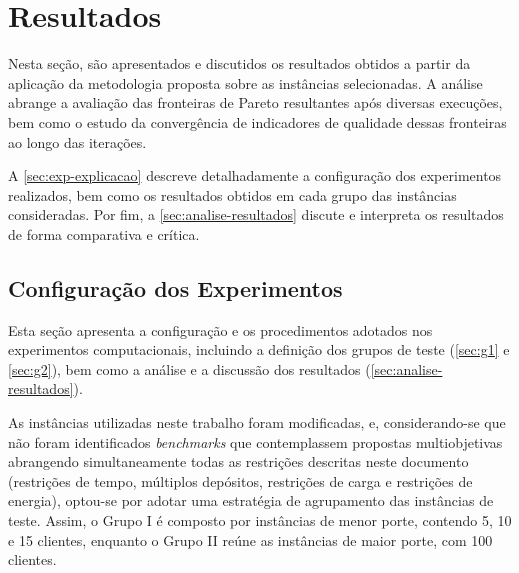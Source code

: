 

\chapter{Resultados}\label{chap:resultados}

Nesta seção, são apresentados e discutidos os resultados obtidos a partir da aplicação da metodologia proposta sobre as instâncias selecionadas. A análise abrange a avaliação das fronteiras de Pareto resultantes após diversas execuções, bem como o estudo da convergência de indicadores de qualidade dessas fronteiras ao longo das iterações.  

A \autoref{sec:exp-explicacao} descreve detalhadamente a configuração dos experimentos realizados, bem como  os resultados obtidos em cada grupo das instâncias consideradas. Por fim, a \autoref{sec:analise-resultados} discute e interpreta os resultados de forma comparativa e crítica.


\section{Configuração dos Experimentos}\label{sec:exp-explicacao}

Esta seção apresenta a configuração e os procedimentos adotados nos experimentos computacionais, incluindo a definição dos grupos de teste (\autoref{sec:g1} e \autoref{sec:g2}), bem como a análise e a discussão dos resultados (\autoref{sec:analise-resultados}).

As instâncias utilizadas neste trabalho foram modificadas, e, considerando-se que não foram identificados \textit{benchmarks} que contemplassem propostas multiobjetivas abrangendo simultaneamente todas as restrições descritas neste documento (restrições de tempo, múltiplos depósitos, restrições de carga e restrições de energia), optou-se por adotar uma estratégia de agrupamento das instâncias de teste. Assim, o Grupo I é composto por instâncias de menor porte, contendo 5, 10 e 15 clientes, enquanto o Grupo II reúne as instâncias de maior porte, com 100 clientes.

